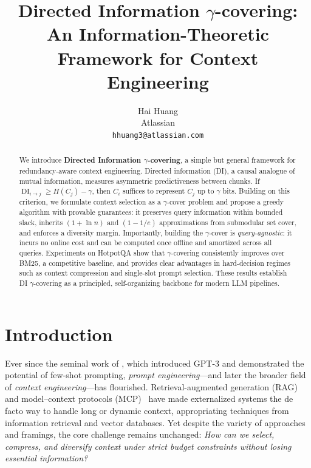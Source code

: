 \documentclass{article} %
\title{Directed Information $\gamma$-covering: An Information-Theoretic Framework for Context Engineering}
\author{Hai Huang \\
Atlassian \\
\texttt{hhuang3@atlassian.com}
}
\theoremstyle{definition}
\DeclareMathOperator{\DI}{DI}
\begin{document}
\maketitle

\begin{abstract}
We introduce \textbf{Directed Information $\gamma$-covering}, a simple but general framework for redundancy-aware context engineering. Directed information (DI), a causal analogue of mutual information, measures asymmetric predictiveness between chunks. If $\DI_{i \to j} \ge H(C_j) - \gamma$, then $C_i$ suffices to represent $C_j$ up to $\gamma$ bits. Building on this criterion, we formulate context selection as a $\gamma$-cover problem and propose a greedy algorithm with provable guarantees: it preserves query information within bounded slack, inherits $(1+\ln n)$ and $(1-1/e)$ approximations from submodular set cover, and enforces a diversity margin. Importantly, building the $\gamma$-cover is \emph{query-agnostic}: it incurs no online cost and can be computed once offline and amortized across all queries. Experiments on HotpotQA show that $\gamma$-covering consistently improves over BM25, a competitive baseline, and provides clear advantages in hard-decision regimes such as context compression and single-slot prompt selection. These results establish DI $\gamma$-covering as a principled, self-organizing backbone for modern LLM pipelines.
\end{abstract}

\section{Introduction}

Ever since the seminal work of \citet{brown2020fewshot-learner}, which introduced GPT-3 and demonstrated the potential of few-shot prompting, \emph{prompt engineering}---and later the broader field of \emph{context engineering}---has flourished. Retrieval-augmented generation (RAG)~\citep{lewis2020retrieval} and model–context protocols (MCP)~\citep{hou2025mcp} have made externalized systems the de facto way to handle long or dynamic context, appropriating techniques from information retrieval and vector databases. Yet despite the variety of approaches and framings, the core challenge remains unchanged: \emph{How can we select, compress, and diversify context under strict budget constraints without losing essential information?}
\end{document}

